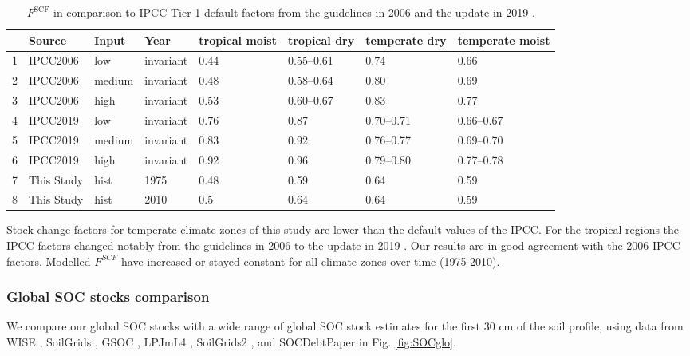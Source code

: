 \documentclass[gc, manuscript]{copernicus}
\begin{document}
\begin{table}[ht]
\centering
\caption{$F^{\mathrm{SCF}}$ in comparison to IPCC Tier 1 default factors from the guidelines in 2006 \citep{lasco_cropland_in_ipcc_2006} and the update in 2019 \citep{ogle_cropland_in_ipcc_2019}.} 
\label{tab:SCFglo}
\begin{tabular}{rlllllll}
  \hline
 & Source & Input & Year & tropical moist & tropical dry & temperate dry & temperate moist \\ 
  \hline
1 & IPCC2006 & low & invariant & 0.44 & 0.55--0.61 & 0.74 & 0.66 \\ 
  2 & IPCC2006 & medium & invariant & 0.48 & 0.58--0.64 & 0.80 & 0.69 \\ 
  3 & IPCC2006 & high & invariant & 0.53 & 0.60--0.67 & 0.83 & 0.77 \\ 
  4 & IPCC2019 & low & invariant & 0.76 & 0.87 & 0.70--0.71 & 0.66--0.67 \\ 
  5 & IPCC2019 & medium & invariant & 0.83 & 0.92 & 0.76--0.77 & 0.69--0.70 \\ 
  6 & IPCC2019 & high & invariant & 0.92 & 0.96 & 0.79--0.80 & 0.77--0.78 \\ 
  7 & This Study & hist & 1975 & 0.48 & 0.59 & 0.64 & 0.59 \\ 
  8 & This Study & hist & 2010 & 0.5 & 0.64 & 0.64 & 0.59 \\ 
   \hline
\end{tabular}
\end{table}

Stock change factors for temperate climate zones of this study are lower than the default values of the IPCC. For the tropical regions the IPCC factors changed notably from the guidelines in 2006 \citep{lasco_cropland_in_ipcc_2006} to the update in 2019 \citep{ogle_cropland_in_ipcc_2019}. Our results are in good agreement with the 2006 IPCC factors. Modelled \(F^{SCF}\) have increased or stayed constant for all climate zones over time (1975-2010).

\hypertarget{global-soc-stocks-comparison}{%
\subsubsection{Global SOC stocks comparison}\label{global-soc-stocks-comparison}}

We compare our global SOC stocks with a wide range of global SOC stock estimates for the first 30 cm of the soil profile, using data from WISE \citep{batjes_harmonized_2016}, SoilGrids \citep{hengl_soilgrids250m_2017}, GSOC \citep{fao_global_2018}, LPJmL4 \citep{schaphoff_lpjml4_2018-1}, SoilGrids2 \citep{poggio_soilgrids_2021}, and SOCDebtPaper \citep{sanderman_soil_2017} in Fig. \ref{fig:SOCglo}.
\end{document}
